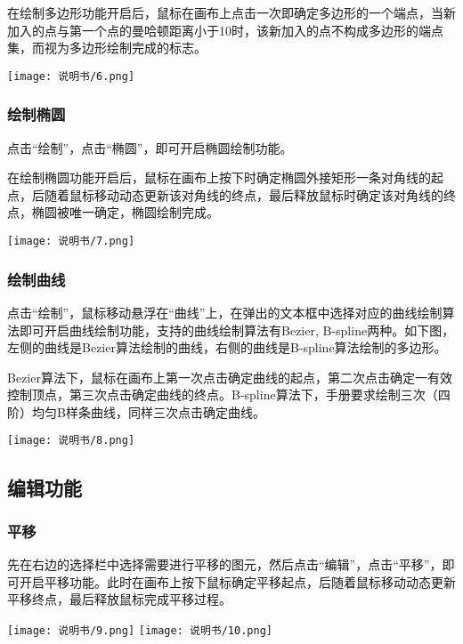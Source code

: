 \documentclass[a4paper,UTF8]{article}
\theoremstyle{definition}
\begin{document}
		在绘制多边形功能开启后，鼠标在画布上点击一次即确定多边形的一个端点，当新加入的点与第一个点的曼哈顿距离小于10时，该新加入的点不构成多边形的端点集，而视为多边形绘制完成的标志。
		\begin{center}
			\texttt{[image: 说明书/6.png]}
		\end{center}
	
		\subsubsection{绘制椭圆}
		点击“绘制”，点击“椭圆”，即可开启椭圆绘制功能。
		
		在绘制椭圆功能开启后，鼠标在画布上按下时确定椭圆外接矩形一条对角线的起点，后随着鼠标移动动态更新该对角线的终点，最后释放鼠标时确定该对角线的终点，椭圆被唯一确定，椭圆绘制完成。
		\begin{center}
			\texttt{[image: 说明书/7.png]}
		\end{center}
		
		\subsubsection{绘制曲线}
		点击“绘制”，鼠标移动悬浮在“曲线”上，在弹出的文本框中选择对应的曲线绘制算法即可开启曲线绘制功能，支持的曲线绘制算法有Bezier, B-spline两种。如下图，左侧的曲线是Bezier算法绘制的曲线，右侧的曲线是B-spline算法绘制的多边形。
		
		Bezier算法下，鼠标在画布上第一次点击确定曲线的起点，第二次点击确定一有效控制顶点，第三次点击确定曲线的终点。B-spline算法下，手册要求绘制三次（四阶）均匀B样条曲线，同样三次点击确定曲线。
		\begin{center}
			\texttt{[image: 说明书/8.png]}
		\end{center}
	
		\subsection{编辑功能}
		\subsubsection{平移}
		先在右边的选择栏中选择需要进行平移的图元，然后点击“编辑”，点击“平移”，即可开启平移功能。此时在画布上按下鼠标确定平移起点，后随着鼠标移动动态更新平移终点，最后释放鼠标完成平移过程。
		\begin{center}
			\texttt{[image: 说明书/9.png]}
			\texttt{[image: 说明书/10.png]}
		\end{center}
	
\end{document}
